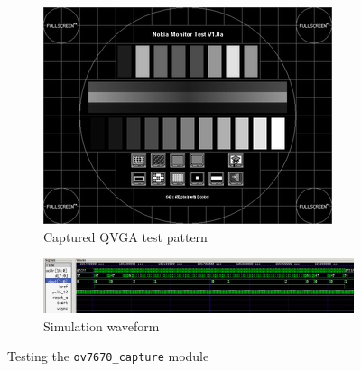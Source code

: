 \documentclass[a4paper]{report}
\begin{document}
\begin{figure}
  \centering
  \begin{subfigure}[b]{1\textwidth}
    \centering
    \includegraphics[width=\textwidth]{qvga_test_pattern.png}
    \caption{Captured QVGA test pattern}
    \label{fig:qvga_test_pattern}
  \end{subfigure}
  \vfill
  \begin{subfigure}[b]{1\textwidth}
    \centering
    \includegraphics[width=\textwidth]{ov7670_capture_waveform.png}
    \caption{Simulation waveform}
    \label{fig:ov7670_capture_waveform}
  \end{subfigure}
  \caption{Testing the \texttt{ov7670\_capture} module}
  \label{fig:testing_ov7670}
\end{figure}
\end{document}
